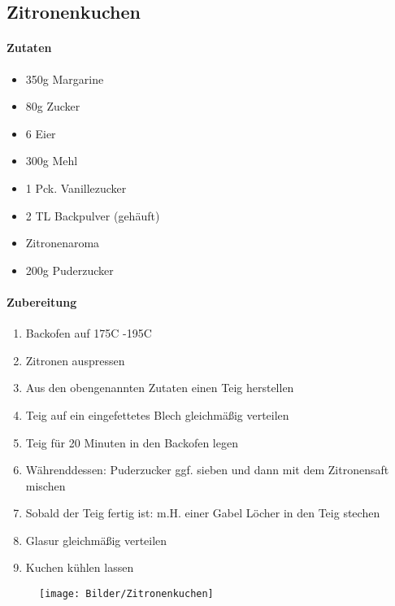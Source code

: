 \newpage
\subsection{Zitronenkuchen}
\paragraph{Zutaten}
\begin{itemize}[noitemsep]
	\item 350g Margarine
	\item 80g Zucker
	\item 6 Eier
	\item 300g Mehl
	\item 1 Pck. Vanillezucker
	\item 2 TL Backpulver (gehäuft)
	\item Zitronenaroma
	\item 200g Puderzucker
\end{itemize}
\paragraph{Zubereitung}
\begin{enumerate}[noitemsep]
	\item Backofen auf 175\textdegree C -195\textdegree C
	\item Zitronen auspressen
	\item Aus den obengenannten Zutaten einen Teig herstellen
	\item Teig auf ein eingefettetes Blech gleichmäßig verteilen
	\item Teig für 20 Minuten in den Backofen legen
	\item Währenddessen: Puderzucker ggf. sieben und dann mit dem Zitronensaft mischen
	\item Sobald der Teig fertig ist: m.H. einer Gabel Löcher in den Teig stechen
	\item Glasur gleichmäßig verteilen
	\item Kuchen kühlen lassen
\end{enumerate}
\begin{figure}[h]
\centering
\texttt{[image: Bilder/Zitronenkuchen]}
\end{figure}